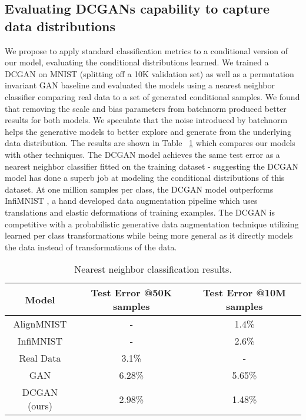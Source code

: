 \documentclass{article} \usepackage{iclr2016_conference,times}
\begin{document}
\subsection{Evaluating DCGANs capability to capture data distributions}

We propose to apply standard classification metrics to a conditional version of our model, evaluating the conditional distributions learned. We trained a DCGAN on MNIST (splitting off a 10K validation set) as well as a permutation invariant GAN baseline and evaluated the models using a nearest neighbor classifier comparing real data to a set of generated conditional samples. We found that removing the scale and bias parameters from batchnorm produced better results for both models. We speculate that the noise introduced by batchnorm helps the generative models to better explore and generate from the underlying data distribution. The results are shown in Table ~\ref{tab:nnc_mnist_results} which compares our models with other techniques. The DCGAN model achieves the same test error as a nearest neighbor classifier fitted on the training dataset - suggesting the DCGAN model has done a superb job at modeling the conditional distributions of this dataset. At one million samples per class, the DCGAN model outperforms InfiMNIST \citep{loosli-canu-bottou-2006}, a hand developed data augmentation pipeline which uses translations and elastic deformations of training examples. The DCGAN is competitive with a probabilistic generative data augmentation technique utilizing learned per class transformations \citep{Hauberg2015} while being more general as it directly models the data instead of transformations of the data.

\begin{table}[h]
\caption{Nearest neighbor classification results.}
\begin{center}
\begin{tabular}{ |c|c|c| }
    \hline
    \textbf{Model} & Test Error @50K samples & Test Error @10M samples\\
    \hline
    AlignMNIST & - & 1.4\% \\
    InfiMNIST & - & 2.6\% \\
    Real Data & 3.1\% & - \\
    GAN & 6.28\% & 5.65\% \\
    \hline
    DCGAN (ours) & 2.98\% & 1.48\% \\
    \hline
\end{tabular}
\end{center}
\label{tab:nnc_mnist_results}
\end{table}
\end{document}

